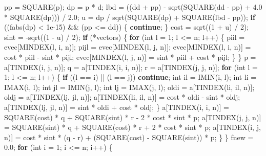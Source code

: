 \documentclass[12pt,]{article}
\newenvironment{Shaded}{\begin{snugshade}}{\end{snugshade}}
\newcommand{\ControlFlowTok}[1]{\textcolor[rgb]{0.13,0.29,0.53}{\textbf{#1}}}
\newcommand{\DataTypeTok}[1]{\textcolor[rgb]{0.13,0.29,0.53}{#1}}
\newcommand{\DecValTok}[1]{\textcolor[rgb]{0.00,0.00,0.81}{#1}}
\newcommand{\FloatTok}[1]{\textcolor[rgb]{0.00,0.00,0.81}{#1}}
\newcommand{\NormalTok}[1]{#1}
\begin{document}
\begin{Shaded}
\begin{Highlighting}[]
{{{{{{{{\NormalTok{        pp = SQUARE(p);}
\NormalTok{        dp = p * d;}
\NormalTok{        lbd = ((dd + pp) - sqrt(SQUARE(dd - pp) + }\FloatTok{4.0}\NormalTok{ * SQUARE(dp))) / }\FloatTok{2.0}\NormalTok{;}
\NormalTok{        u = dp / sqrt(SQUARE(dp) + SQUARE(lbd - pp));}
        \ControlFlowTok{if}\NormalTok{ ((fabs(dp) < }\FloatTok{1e-15}\NormalTok{) && (pp <= dd)) \{}
          \ControlFlowTok{continue}\NormalTok{;}
\NormalTok{        \}}
\NormalTok{        cost = sqrt((}\DecValTok{1}\NormalTok{ + u) / }\DecValTok{2}\NormalTok{);}
\NormalTok{        sint = -sqrt((}\DecValTok{1}\NormalTok{ - u) / }\DecValTok{2}\NormalTok{);}
        \ControlFlowTok{if}\NormalTok{ (*vectors) \{}
          \ControlFlowTok{for}\NormalTok{ (}\DataTypeTok{int}\NormalTok{ l = }\DecValTok{1}\NormalTok{; l <= n; l++) \{}
\NormalTok{            piil = evec[MINDEX(l, i, n)];}
\NormalTok{            pijl = evec[MINDEX(l, j, n)];}
\NormalTok{            evec[MINDEX(l, i, n)] = cost * piil - sint * pijl;}
\NormalTok{            evec[MINDEX(l, j, n)] = sint * piil + cost * pijl;}
\NormalTok{          \}}
\NormalTok{        \}}
\NormalTok{        p = a[TINDEX(i, j, n)];}
\NormalTok{        q = a[TINDEX(i, i, n)];}
\NormalTok{        r = a[TINDEX(j, j, n)];}
        \ControlFlowTok{for}\NormalTok{ (}\DataTypeTok{int}\NormalTok{ l = }\DecValTok{1}\NormalTok{; l <= n; l++) \{}
          \ControlFlowTok{if}\NormalTok{ ((l == i) || (l == j))}
            \ControlFlowTok{continue}\NormalTok{;}
          \DataTypeTok{int}\NormalTok{ il = IMIN(i, l);}
          \DataTypeTok{int}\NormalTok{ li = IMAX(i, l);}
          \DataTypeTok{int}\NormalTok{ jl = IMIN(j, l);}
          \DataTypeTok{int}\NormalTok{ lj = IMAX(j, l);}
\NormalTok{          oldi = a[TINDEX(li, il, n)];}
\NormalTok{          oldj = a[TINDEX(lj, jl, n)];}
\NormalTok{          a[TINDEX(li, il, n)] = cost * oldi - sint * oldj;}
\NormalTok{          a[TINDEX(lj, jl, n)] = sint * oldi + cost * oldj;}
\NormalTok{        \}}
\NormalTok{        a[TINDEX(i, i, n)] =}
\NormalTok{            SQUARE(cost) * q + SQUARE(sint) * r - }\DecValTok{2}\NormalTok{ * cost * sint * p;}
\NormalTok{        a[TINDEX(j, j, n)] =}
\NormalTok{            SQUARE(sint) * q + SQUARE(cost) * r + }\DecValTok{2}\NormalTok{ * cost * sint * p;}
\NormalTok{        a[TINDEX(i, j, n)] =}
\NormalTok{            cost * sint * (q - r) + (SQUARE(cost) - SQUARE(sint)) * p;}
\NormalTok{      \}}
\NormalTok{    \}}
\NormalTok{    fnew = }\FloatTok{0.0}\NormalTok{;}
    \ControlFlowTok{for}\NormalTok{ (}\DataTypeTok{int}\NormalTok{ i = }\DecValTok{1}\NormalTok{; i <= n; i++) \{}
}}}}}}}}
\end{Highlighting}
\end{Shaded}
\end{document}
